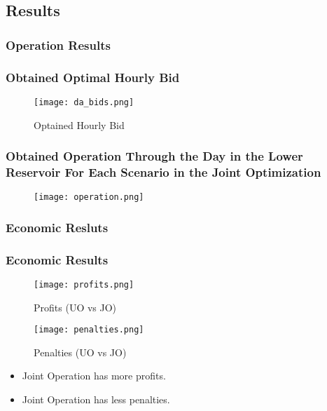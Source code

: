 \subsection{Results}
\subsubsection{Operation Results}
\begin{frame}
  \frametitle{Obtained Optimal Hourly Bid}

\begin{figure}[htbp]
  \centering
  \texttt{[image: da\_bids.png]}
  \caption{Optained Hourly Bid}
\end{figure}
\end{frame}

\begin{frame}
\frametitle{Obtained Operation Through the Day in the Lower Reservoir For Each Scenario in the Joint Optimization}
\begin{figure}[htbp]
  \centering
  \texttt{[image: operation.png]}
\end{figure}
\end{frame}
\subsubsection{Economic Resluts}
\begin{frame}
\frametitle{Economic Results}
\begin{figure}[htbp]
  \centering
  \begin{minipage}[htbp]{0.45\linewidth}
    \texttt{[image: profits.png]}
    \caption{Profits (UO vs JO)}
  \end{minipage}
  \begin{minipage}[htbp]{0.45\linewidth}
    \texttt{[image: penalties.png]}
    \caption{Penalties (UO vs JO)}
  \end{minipage}
\end{figure}
\begin{itemize}
\item Joint Operation has more profits.
\item Joint Operation has less penalties.
\end{itemize}
\end{frame}
